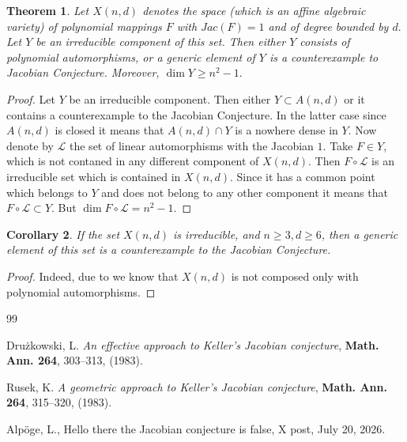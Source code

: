 \documentclass{amsart}
\newtheorem{theorem}{Theorem}[section]
\newtheorem{corollary}[theorem]{Corollary}
\begin{document}
\begin{theorem} Let $X(n,d)$ denotes the space (which is an affine algebraic variety) of polynomial mappings $F$ with $Jac(F)=1$ and of degree bounded by $d.$ Let $Y$ be an irreducible component of this set. Then either $Y$ consists of polynomial automorphisms, or a generic element of $Y$ is a counterexample to Jacobian Conjecture. Moreover, $\dim Y \ge n^2-1.$
\end{theorem}

\begin{proof} Let $Y$ be an irreducible component. Then either $Y\subset A(n,d)$ or it contains a counterexample to the Jacobian Conjecture. In the latter case since $A(n,d)$ is closed it means that $A(n,d)\cap Y$ is a nowhere dense in $Y.$ Now denote by $\mathcal L$ the set of linear automorphisms with the Jacobian $1.$ Take $F\in Y$, which is not contaned in any different component of $X(n,d).$
Then $F\circ \mathcal{L}$ is an irreducible set which is contained in $X(n,d).$ Since it has a common point which belongs to $Y$ and does not belong to any other component it means that $F\circ \mathcal{L}\subset Y.$ But $\dim F\circ \mathcal{L}=n^2-1.$
\end{proof}

\begin{corollary}
If the set $X(n,d)$ is irreducible, and $n\ge 3, d\ge 6$, then a generic element of this set is a counterexample to the Jacobian Conjecture. 
\end{corollary}

\begin{proof}
Indeed, due to \cite{cjc} we know that $X(n,d)$ is not composed only with polynomial automorphisms.
\end{proof}



   

\begin{thebibliography}{99} 

 Drużkowski, L.
{\em An effective approach to Keller's Jacobian conjecture},
{\bf Math. Ann. 264},  303–313, (1983).

 Rusek, K.
{\em A geometric approach to Keller's Jacobian conjecture},
{\bf Math. Ann. 264}, 315–320, (1983).

  Alpöge, L.,  Hello there the Jacobian conjecture is false, X post, July 20, 2026.



    \end{thebibliography}
	
\end{document}
